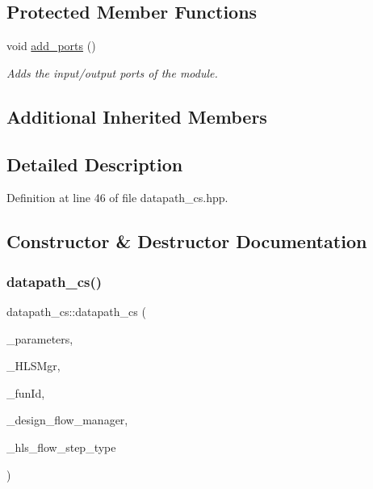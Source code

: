\subsection*{Protected Member Functions}
\begin{DoxyCompactItemize}
\item 
void \hyperlink{classdatapath__cs_af1a3075eb56ee8636b95a1c4114bbe70}{add\+\_\+ports} ()
\begin{DoxyCompactList}\small\item\em Adds the input/output ports of the module. \end{DoxyCompactList}\end{DoxyCompactItemize}
\subsection*{Additional Inherited Members}


\subsection{Detailed Description}


Definition at line 46 of file datapath\+\_\+cs.\+hpp.



\subsection{Constructor \& Destructor Documentation}
\mbox{\label{classdatapath__cs_abd6ce04b1cbaec19dc48f4aef2a0e0ba}} 
\subsubsection{\texorpdfstring{datapath\+\_\+cs()}{datapath\_cs()}}
{\footnotesize\ttfamily datapath\+\_\+cs\+::datapath\+\_\+cs (\begin{DoxyParamCaption}\item[{const \hyperlink{Parameter_8hpp_a37841774a6fcb479b597fdf8955eb4ea}{Parameter\+Const\+Ref}}]{\+\_\+parameters,  }\item[{const \hyperlink{hls__manager_8hpp_acd3842b8589fe52c08fc0b2fcc813bfe}{H\+L\+S\+\_\+manager\+Ref}}]{\+\_\+\+H\+L\+S\+Mgr,  }\item[{unsigned int}]{\+\_\+fun\+Id,  }\item[{const Design\+Flow\+Manager\+Const\+Ref}]{\+\_\+design\+\_\+flow\+\_\+manager,  }\item[{const \hyperlink{hls__step_8hpp_ada16bc22905016180e26fc7e39537f8d}{H\+L\+S\+Flow\+Step\+\_\+\+Type}}]{\+\_\+hls\+\_\+flow\+\_\+step\+\_\+type }\end{DoxyParamCaption})}



